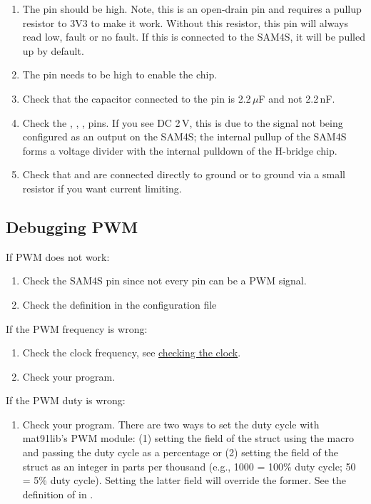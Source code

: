 \begin{enumerate}
\item The  pin should be high.  Note, this is an
  open-drain pin and requires a pullup resistor to 3V3 to make it
  work.  Without this resistor, this pin will always read low, fault
  or no fault.  If this is connected to the SAM4S, it will be pulled
  up by default.

\item The  pin needs to be high to enable the chip.

\item Check that the capacitor connected to the  pin is
  2.2\,$\mu$F and not 2.2\,nF.

\item Check the , , ,  pins.
  If you see DC 2\,V, this is due to the signal not being configured
  as an output on the SAM4S; the internal pullup of the SAM4S forms a
  voltage divider with the internal pulldown of the H-bridge chip.

\item Check that  and  are connected
  directly to ground or to ground via a small resistor if you want
  current limiting.
\end{enumerate}


\subsection{Debugging PWM}
\label{debugging-pwm}

If PWM does not work:

\begin{enumerate}
\item
  Check the SAM4S pin since not every pin can be a PWM signal.
\item
  Check the definition in the configuration file 
\end{enumerate}

If the PWM frequency is wrong:

\begin{enumerate}
\item
  Check the clock frequency, see
  \hyperref[checking-the-clock]{checking the clock}.
\item
  Check your program.
\end{enumerate}

If the PWM duty is wrong:

\begin{enumerate}
\item
  Check your program. There are two ways to set the duty cycle with
  mat91lib's PWM module: (1) setting the  field of the
   struct using the  macro and
  passing the duty cycle as a percentage or (2) setting the
   field of the  struct as an integer
  in parts per thousand (e.g., 1000 = 100\% duty cycle; 50 = 5\% duty
  cycle). Setting the latter field will override the former. See the
  definition of  in .
\end{enumerate}

